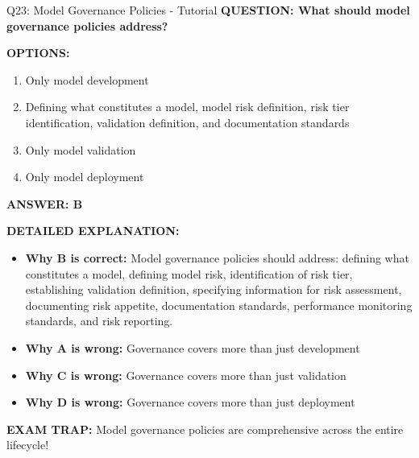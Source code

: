 \documentclass[8pt]{beamer}
\begin{document}
	\begin{frame}{Q23: Model Governance Policies - Tutorial}
		\fontsize{6.5}{7.5}\selectfont
		\textbf{QUESTION: What should model governance policies address?}
		
		\vspace{0.1cm}
		\textbf{OPTIONS:}
		\begin{enumerate}
			\item Only model development
			\item Defining what constitutes a model, model risk definition, risk tier identification, validation definition, and documentation standards
			\item Only model validation
			\item Only model deployment
		\end{enumerate}
		
		\vspace{0.1cm}
		\textcolor{myblue}{\textbf{ANSWER: B}}
		
		\vspace{0.1cm}
		\textbf{DETAILED EXPLANATION:}
		\begin{itemize}
			\item \textbf{Why B is correct:} Model governance policies should address: defining what constitutes a model, defining model risk, identification of risk tier, establishing validation definition, specifying information for risk assessment, documenting risk appetite, documentation standards, performance monitoring standards, and risk reporting.
			\item \textbf{Why A is wrong:} Governance covers more than just development
			\item \textbf{Why C is wrong:} Governance covers more than just validation
			\item \textbf{Why D is wrong:} Governance covers more than just deployment
		\end{itemize}
		
		\textcolor{myred}{\textbf{EXAM TRAP:}} Model governance policies are \textcolor{myblue}{comprehensive across the entire lifecycle}!
	\end{frame}
	
\end{document}
